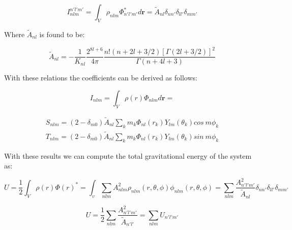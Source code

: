 \documentclass[14pt]{article}
\begin{document}
\begin{equation}\label{eq:energy}
  I_{nlm}^{n'l'm'} = \int_V \rho_{nlm} \Phi_{n'l'm'}^*  d\textbf{r} = \tilde{A}_{nl} \delta_{nn'}
  \delta_{ll'} \delta_{mm'} 
\end{equation}

Where $\tilde{A}_{nl}$ is found to be:

\begin{equation}
    \tilde{A}_{nl} = - \frac{1}{K_{nl}}\frac{2^{8l+6}}{4\pi}\frac{n!(n+2l+3/2)[\Gamma(2l+3/2)]^2}{\Gamma(n+4l+3)}
\end{equation}

With these relations the coefficients can be derived as follows:

\begin{equation}\label{eq:coefficients}
  I_{nlm} = \int_V \rho(r) \Phi_{nlm} d\textbf{r} = 
\end{equation}


\begin{equation}
  \begin{aligned}
    S_{nlm} = (2-\delta_{m0})\tilde{A}_{nl} \sum_k m_k
  \Phi_{nl}(r_k)Y_{lm}(\theta_k) cos\ m\phi_k \\
    T_{nlm} = (2-\delta_{m0})\tilde{A}_{nl} \sum_k m_k 
  \Phi_{nl}(r_k)Y_{lm}(\theta_k) sin\ m\phi_k 
  \end{aligned}
\end{equation}


With these results we can compute the total gravitational energy of the system
as:

\begin{equation}
  U = \dfrac{1}{2} \int_V \rho(r)\Phi(r)^{*} = \int_v  \sum_{nlm} A_{nlm}^2 \rho_{nlm}(r,
  \theta, \phi) \phi_{nlm}(r, \theta, \phi) = \sum_{nlm}
  \frac{A_{n'l'm'}^2}{\tilde{A}_{nl}}
  \delta_{nn'}\delta_{ll'}\delta_{mm'} 
\end{equation}

\begin{equation}
  U = \dfrac{1}{2}\sum_{nlm} \frac{A_{n'l'm'}^2}{\tilde{A}_{n'l'}} = \sum_{nlm} U_{n'l'm'}
\end{equation}
\end{document}

